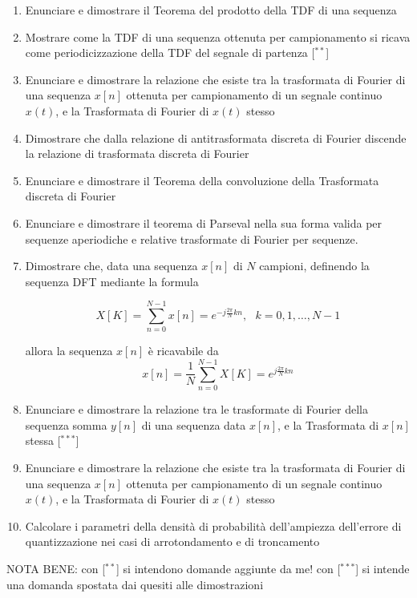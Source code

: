 \documentclass[
]{article}
\begin{document}
\begin{enumerate}
\def\labelenumi{\arabic{enumi}.}
\item
  Enunciare e dimostrare il Teorema del prodotto della TDF di una
  sequenza
\item
  Mostrare come la TDF di una sequenza ottenuta per campionamento si
  ricava come periodicizzazione della TDF del segnale di partenza
  {[}\(^{**}\){]}
\item
  Enunciare e dimostrare la relazione che esiste tra la trasformata di
  Fourier di una sequenza \(x[n]\) ottenuta per campionamento di un
  segnale continuo \(x(t)\), e la Trasformata di Fourier di \(x(t)\)
  stesso
\item
  Dimostrare che dalla relazione di antitrasformata discreta di Fourier
  discende la relazione di trasformata discreta di Fourier
\item
  Enunciare e dimostrare il Teorema della convoluzione della Trasformata
  discreta di Fourier
\item
  Enunciare e dimostrare il teorema di Parseval nella sua forma valida
  per sequenze aperiodiche e relative trasformate di Fourier per
  sequenze.
\item
  Dimostrare che, data una sequenza \(x[n]\) di \(N\) campioni,
  definendo la sequenza DFT mediante la formula

  \[
  \displaystyle
  X[K] = \sum_{n=0}^{N-1} x[n] = e^{-j \frac{2\pi}{N} kn}, \ \ \ k = 0, 1 , \dots, N-1
  \]

  allora la sequenza \(x[n]\) è ricavabile da \[
  \displaystyle
  x[n] = \frac{1}{N} \sum_{n=0}^{N-1} X[K] = e^{j \frac{2\pi}{N} kn}
   \]
\item
  Enunciare e dimostrare la relazione tra le trasformate di Fourier
  della sequenza somma \(y[n]\) di una sequenza data \(x[n]\), e la
  Trasformata di \(x[n]\) stessa {[}\(^{***}\){]}
\item
  Enunciare e dimostrare la relazione che esiste tra la trasformata di
  Fourier di una sequenza \(x[n]\) ottenuta per campionamento di un
  segnale continuo \(x(t)\), e la Trasformata di Fourier di \(x(t)\)
  stesso
\item
  Calcolare i parametri della densità di probabilità dell'ampiezza
  dell'errore di quantizzazione nei casi di arrotondamento e di
  troncamento
\end{enumerate}

NOTA BENE: con {[}\(^{**}\){]} si intendono domande aggiunte da me! con
{[}\(^{***}\){]} si intende una domanda spostata dai quesiti alle
dimostrazioni
\end{document}
